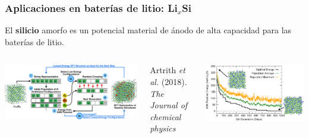 \documentclass[aspectratio=169]{beamer}
\let\oldtextbf\textbf
\renewcommand{\textbf}[1]{\textcolor{nordblue}{\oldtextbf{#1}}}
\begin{document}
    \begin{frame}
        \frametitle{Aplicaciones en baterías de litio: Li$_x$Si}
        
        El \textbf{silicio} amorfo es un potencial material de ánodo de alta
        capacidad para las baterías de litio.
        
        \begin{columns}
            \begin{center}
                \includegraphics[width=\columnwidth]{LiSi-metodo.png}
            \end{center}
            \tiny{Artrith \textit{et al.} (2018). \textit{The Journal of chemical
            physics}}

            \begin{center}
                \includegraphics[width=\columnwidth]{LiSi-optimizacion_de_la_energia.png}
            \end{center}
        \end{columns}
            
    \end{frame}
    
\end{document}
